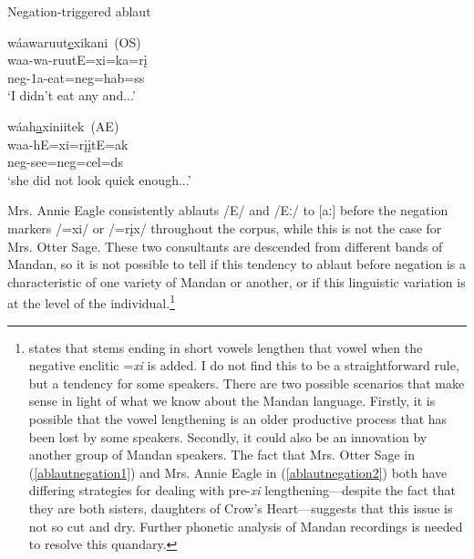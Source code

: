 \begin{exe}
\item\label{ablautnegation} Negation-triggered ablaut

	\begin{xlist}

	\item\label{ablautnegation1}
	\glll wáawaruut\uline{e}xikani~\textnormal{(OS)}\\
	waa-wa-ruutE=xi=ka=rį\\
	neg-1a-\textnormal{eat}=neg=hab=ss\\
	\glt `I didn't eat any and...' \citep[46]{hollow1973a}

	\item\label{ablautnegation2}
	\glll wáah\uline{a}xiniitek~\textnormal{(AE)}\\
	waa-hE=xi=rįįtE=ak\\
	neg-\textnormal{see}=neg=cel=ds\\
	\glt `she did not look quick enough...' \citep[167]{hollow1973a}

	\end{xlist}

\end{exe}

Mrs. Annie Eagle consistently ablauts /E/ and /Eː/ to [aː] before the negation markers /=xi/ or /=rįx/ throughout the corpus, while this is not the case for Mrs. Otter Sage. These two consultants are descended from different bands of Mandan, so it is not possible to tell if this tendency to ablaut before negation is a characteristic of one variety of Mandan or another, or if this linguistic variation is at the level of the individual.\footnote{\citet[37]{mixco1997a} states that stems ending in short vowels lengthen that vowel when the negative enclitic =\textit{xi} is added. I do not find this to be a straightforward rule, but a tendency for some speakers. There are two possible scenarios that make sense in light of what we know about the Mandan language. Firstly, it is possible that the vowel lengthening is an older productive process that has been lost by some speakers. Secondly,  it could also be an innovation by another group of Mandan speakers. The fact that Mrs. Otter Sage in (\ref{ablautnegation1}) and Mrs. Annie Eagle in (\ref{ablautnegation2}) both have differing strategies for dealing with pre-\textit{xi} lengthening---despite the fact that they are both sisters, daughters of Crow's Heart---suggests that this issue is not so cut and dry. Further phonetic analysis of Mandan recordings is needed to resolve this quandary.}

